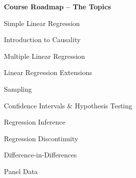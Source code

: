 \documentclass[11pt, aspectratio=169]{beamer}
\newenvironment{wideenumerate}{\enumerate\addtolength{\itemsep}{5pt}}{\endenumerate}
\begin{document}
\begin{frame}{\bf \large Course Roadmap -- The Topics}
	

			\begin{wideenumerate}
				\item Simple Linear Regression 
				\item Introduction to Causality
				\item Multiple Linear Regression
				\item Linear Regression Extensions
				\item Sampling
				\item Confidence Intervals \& Hypothesis Testing
				\item Regression Inference
				\item Regression Discontinuity
				\item Difference-in-Differences
				\item Panel Data
			\end{wideenumerate}

\end{frame}
\end{document}
